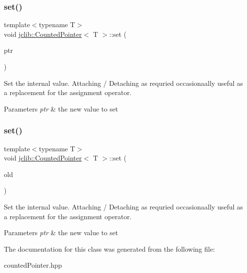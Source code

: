 \subsubsection{\texorpdfstring{set()}{set()}\hspace{0.1cm}{\footnotesize\ttfamily [1/2]}}
{\footnotesize\ttfamily template$<$typename T$>$ \\
void \hyperlink{classjclib_1_1CountedPointer}{jclib\+::\+Counted\+Pointer}$<$ T $>$\+::set (\begin{DoxyParamCaption}\item[{T $\ast$const}]{ptr }\end{DoxyParamCaption})\hspace{0.3cm}{\ttfamily [inline]}}

Set the internal value. Attaching / Detaching as requried occasionaally useful as a replacement for the assignment operator. 
\begin{DoxyParams}{Parameters}
{\em ptr} & the new value to set \\
\hline
\end{DoxyParams}
\mbox{\label{classjclib_1_1CountedPointer_a93e060e76df8f3ac8d20478b128d4514}} 
\subsubsection{\texorpdfstring{set()}{set()}\hspace{0.1cm}{\footnotesize\ttfamily [2/2]}}
{\footnotesize\ttfamily template$<$typename T$>$ \\
void \hyperlink{classjclib_1_1CountedPointer}{jclib\+::\+Counted\+Pointer}$<$ T $>$\+::set (\begin{DoxyParamCaption}\item[{const \hyperlink{classjclib_1_1CountedPointer}{Counted\+Pointer}$<$ T $>$ \&}]{old }\end{DoxyParamCaption})\hspace{0.3cm}{\ttfamily [inline]}}

Set the internal value. Attaching / Detaching as requried occasionaally useful as a replacement for the assignment operator. 
\begin{DoxyParams}{Parameters}
{\em ptr} & the new value to set \\
\hline
\end{DoxyParams}


The documentation for this class was generated from the following file\+:\begin{DoxyCompactItemize}
\item 
counted\+Pointer.\+hpp\end{DoxyCompactItemize}
